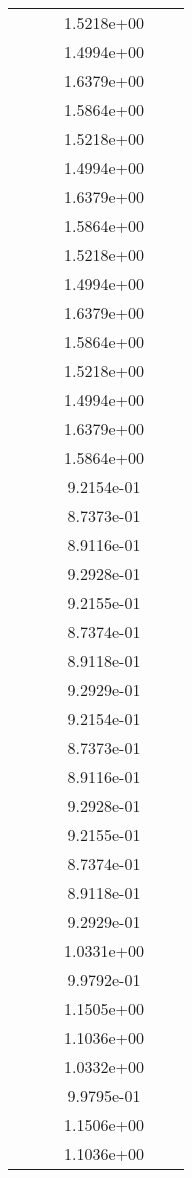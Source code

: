 \begin{xltabular}{\textwidth}{r|rS[table-format=1.3e+2]S[table-format=1.4e+2]S[table-format=1.4e+2]S[table-format=-1.5]}
&  &  & 1.5218e+00 & & \\
&  &  & 1.4994e+00 & & \\
&  &  & 1.6379e+00 & & \\
&  &  & 1.5864e+00 & & \\
&  &  & 1.5218e+00 & & \\
&  &  & 1.4994e+00 & & \\
&  &  & 1.6379e+00 & & \\
&  &  & 1.5864e+00 & & \\
&  &  & 1.5218e+00 & & \\
&  &  & 1.4994e+00 & & \\
&  &  & 1.6379e+00 & & \\
&  &  & 1.5864e+00 & & \\
&  &  & 1.5218e+00 & & \\
&  &  & 1.4994e+00 & & \\
&  &  & 1.6379e+00 & & \\
&  &  & 1.5864e+00 & & \\
&  &  & 9.2154e-01 & & \\
&  &  & 8.7373e-01 & & \\
&  &  & 8.9116e-01 & & \\
&  &  & 9.2928e-01 & & \\
&  &  & 9.2155e-01 & & \\
&  &  & 8.7374e-01 & & \\
&  &  & 8.9118e-01 & & \\
&  &  & 9.2929e-01 & & \\
&  &  & 9.2154e-01 & & \\
&  &  & 8.7373e-01 & & \\
&  &  & 8.9116e-01 & & \\
&  &  & 9.2928e-01 & & \\
&  &  & 9.2155e-01 & & \\
&  &  & 8.7374e-01 & & \\
&  &  & 8.9118e-01 & & \\
&  &  & 9.2929e-01 & & \\
&  &  & 1.0331e+00 & & \\
&  &  & 9.9792e-01 & & \\
&  &  & 1.1505e+00 & & \\
&  &  & 1.1036e+00 & & \\
&  &  & 1.0332e+00 & & \\
&  &  & 9.9795e-01 & & \\
&  &  & 1.1506e+00 & & \\
&  &  & 1.1036e+00 & & \\

\end{xltabular}
